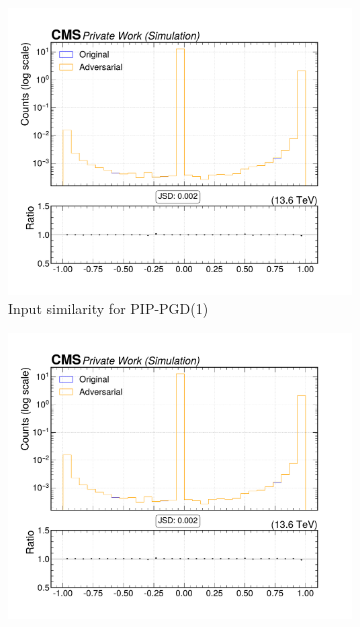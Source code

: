\begin{figure}[htbp]
  \centering
  \begin{subfigure}[t]{0.32\textwidth}
    \includegraphics[width=\linewidth]{media/output/features/compare/combined_it_1/cmp_vtx_arr_sv_costhetasvpv.pdf}
    \caption*{Input similarity for PIP-PGD(1)}
  \end{subfigure}\hfill
  \begin{subfigure}[t]{0.32\textwidth}
    \includegraphics[width=\linewidth]{media/output/features/compare/combined_it_2/cmp_vtx_arr_sv_costhetasvpv.pdf}

\end{subfigure}
\end{figure}
